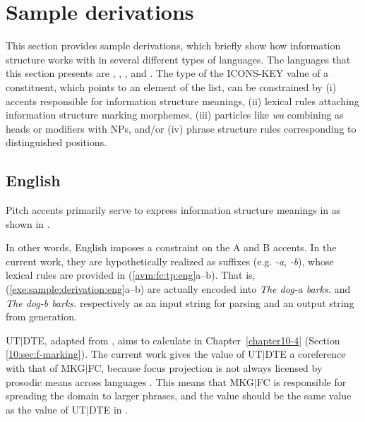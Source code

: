 \section{Sample derivations}
\label{9:sec:samples}



This section provides sample derivations, which briefly show how
information structure works with  in several different types of
languages. The languages that this section presents are ,
, , and . The type of the
ICONS-KEY value of a constituent, which points to an element of the
 list, can be constrained by (i) accents responsible for
information structure meanings, (ii) lexical rules attaching
information structure marking morphemes, (iii) particles like
 \textit{wa} combining as heads or modifiers with NPs,
and/or (iv) phrase structure rules corresponding to distinguished
positions.





\subsection{English}
\label{9:ssec:eng}

Pitch accents primarily serve to express information structure
meanings in  as shown in .


In other words, English imposes a constraint on the A and B
accents. In the current work, they are hypothetically realized as
suffixes (e.g. \textit{-a}, \textit{-b}), whose lexical rules are provided in
(\ref{avm:fc:tp:eng}a--b). That is,
(\ref{exe:sample:derivation:eng}a--b) are actually encoded into
\textit{The dog-a barks.} and \textit{The dog-b barks.}  respectively
as an input string for parsing and an output string from generation.




UT{$\mid$}DTE, adapted from \citet{bildhauer:07}, aims to calculate
 in Chapter~\ref{chapter10-4}
(Section \ref{10:sec:f-marking}). The current work gives the value of
UT{$\mid$}DTE a coreference with that of MKG{$\mid$}FC, because focus
projection is not always licensed by prosodic means across languages
\citep{choe:02}. This means that MKG{$\mid$}FC is responsible
for spreading the  domain to larger phrases, and the value should
be the same value as the value of UT{$\mid$}DTE in .

